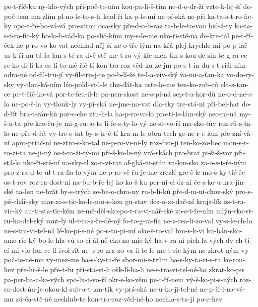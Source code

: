 pe-t-říč-ku
ny-klo-vých
při-poč-te-ním
kou-pa-li-š-tím
ne-d-o-dr-ží
vzte-k-lej-ší
do-poč-tem
ma-zlím
pl-no-le-to-s-ti
lead-ři
ka-p-le-mi
ne-pí-ská
ne-při
ka-ta-s-t-ro-fic-ky
opo-t-ře-bo-vá-vá
pro-strou
oca-sky
pře-d-o-b-raz
ta-b-le-to-vou
hid-ž-ry
ka-ta-s-t-ro-fic-ký
ho-lo-b-rád-ka
po-slíč-kům
my-s-le-me
uko-ři-stě-na
de-kre-tál
pe-t-ří-ček
ne-p-ro-vo-ko-vat
nechlad-něj-ší
ne-o-tře-lým
na-křá-plej
krychle-mi
po-p-lač
us-k-ři-nu-tá
fa-lan-s-té-ra
dvě-stě-me-t-ro-vý
kle-men-tin-s-kou
de-sin-te-g-ra-ce
re-ko-di-fi-ka-ce
li-to-mě-řič-tí
kon-tra-roz-věd-ku
ze-jm
po-s-t-in-du-s-t-riál-ním
odra-né
od-fil-tru-jí
vy-fil-tru-j-te
po-b-lí-že
te-l-a-viv-ský
va-nu-a-ťan-ka
vo-do-ry-sky
vy-tlou-ká-ním
léo-pold-vi-l-le
chu-ďát-ka
uste-le-me
ten-ko-zob-ců
ela-s-tan-ce
pe-t-říč-ko-vá
por-te-feu-il-le
pa-nen-skost
ne-s-pí-ná
sep-t-a-kor-dů
ne-o-d-ne-s-la
ne-po-š-la
vy-tlouk-ly
vy-pí-ská
ne-jme-no-vat
dla-sky
tre-stá-ni
při-bel-hat
do-d-řít
bra-t-rán-ků
por-s-che
ztu-h-la
ha-p-ro-va-lo
pro-ti-is-lám-ský
neo-ra-ná
my-š-a-ta
pře-kro-ču-je
mi-g-ru-je-te
li-fe-s-ty-lo-vý
ne-st-vo-ří
ma-sko-tův
roz-rů-s-ta-lo
ne-pře-d-řít
vy-tre-s-tat
by-s-tr-č-tí
kra-m-le
obra-tech
ge-ne-r-e-lem
pře-zní-vá-ní
apro-priač-ní
ne-ztro-s-ko-tal
ne-p-ro-vi-ni-ly
roz-dvo-jí
ten-ko-zo-bec
mon-s-t-ro-zi-ta
ne-ji-ný
os-t-ra-ži-tý-mi
při-š-ko-le-ný
vrá-skách
pro-brat
pi-ši-š-vor
při-stá-lo
uko-ři-stě-ní
na-sky-tl
zo-t-ví-rat
af-ghá-ni-stán
va-lon-sko
za-o-s-t-ře-ným
pro-z-ra-ď-te
ul-t-ra-fia-lo-vým
ne-p-ro-vě-řu-je-me
zrezlé
gre-š-le
mo-s-ky-tié-ře
os-t-rev
roz-ra-dost-ní
na-bu-b-ře-lej
ko-ko-š-ku
per-ni-ci-óz-ní
če-s-ko-u-kra-jin-ské
aa-len
ne-brát
by-s-trých
se-be-o-chra-ny
ru-b-lí-ků
pře-d-m-ni-chov-ský
pro-s-pě-chář-sky
mar-xi-s-tic-ko-le-nin-s-kou
gu-stav
dez-o-xi-dač-ní
krajz-lík
os-t-ra-vic-ký
an-ti-sta-tic-kém
ze-mě-děl-sko-po-t-ra-vi-nář-ské
zo-s-t-ře-ním
mlýn-sko-st-ru-ha-del-ský
rant-ly
ul-t-ra-z-ře-dě-ný
fo-to-g-ra-fia
ne-z-rea-li-zo-val
vy-s-le-ch-lo
ne-s-tra-vi-tel-ná
lé-ko-pi-s-né
po-s-tu-pi-mí
oko-š-to-val
bro-s-k-vi
ku-bán-sko-ame-ric-ký
bo-le-hla-vů
so-ci-ál-ně-eko-no-mic-ký
ha-v-ra-ní
pich-la-vých
dy-ch-tí-cí-mi
vio-lon-ce-ll
ivoi-rit
ne-p-ro-zra-zo-va-li
te-le-me-t-ric-kým
ne-zkrot-ným
vy-poč-te-né-mu
vy-mez-me
ba-s-ky-ta-ře
sbor-mi-s-trům
ba-s-ky-ta-ri-s-ta
ko-rou-hev
pře-hr-š-le
pře-t-řu
při-sta-vi-li
ošk-lí-ba-li
ne-s-tra-vi-tel-né-ho
zkrat-ko-pis
pa-per-ba-c-ko-vých
spo-lu-t-vo-ří
okr-s-ko-vém
pe-t-ří-nem
vý-š-ko-pi-s-ných
roz-ra-dost-ňu-je
okou-kl
sub-a-t-lan-tik
vy-prá-ská
ne-u-ko-ji-tel-né
ne-p-ři-l-na-vé-mu
zú-ča-stě-né
nechlub-te
kon-tra-roz-věd-né-ho
nechla-s-ta-jí
po-c-hev
